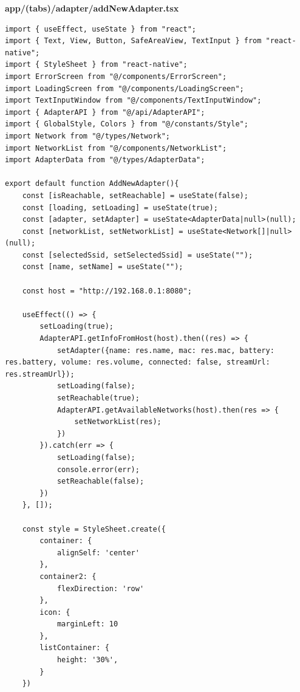 \documentclass[11pt, twoside]{article}
\begin{document}
\textbf{app/(tabs)/adapter/addNewAdapter.tsx}
\begin{lstlisting}
import { useEffect, useState } from "react";
import { Text, View, Button, SafeAreaView, TextInput } from "react-native";
import { StyleSheet } from "react-native";
import ErrorScreen from "@/components/ErrorScreen";
import LoadingScreen from "@/components/LoadingScreen";
import TextInputWindow from "@/components/TextInputWindow";
import { AdapterAPI } from "@/api/AdapterAPI";
import { GlobalStyle, Colors } from "@/constants/Style";
import Network from "@/types/Network";
import NetworkList from "@/components/NetworkList";
import AdapterData from "@/types/AdapterData";

export default function AddNewAdapter(){
    const [isReachable, setReachable] = useState(false);
    const [loading, setLoading] = useState(true);
    const [adapter, setAdapter] = useState<AdapterData|null>(null);
    const [networkList, setNetworkList] = useState<Network[]|null>(null);
    const [selectedSsid, setSelectedSsid] = useState("");
    const [name, setName] = useState("");

    const host = "http://192.168.0.1:8080";

    useEffect(() => {
        setLoading(true);
        AdapterAPI.getInfoFromHost(host).then((res) => {
            setAdapter({name: res.name, mac: res.mac, battery: res.battery, volume: res.volume, connected: false, streamUrl: res.streamUrl});
            setLoading(false);
            setReachable(true);
            AdapterAPI.getAvailableNetworks(host).then(res => {
                setNetworkList(res);
            })
        }).catch(err => {
            setLoading(false);
            console.error(err);
            setReachable(false);
        })
    }, []);

    const style = StyleSheet.create({
        container: {
            alignSelf: 'center'
        },
        container2: {
            flexDirection: 'row'
        },
        icon: {
            marginLeft: 10
        },
        listContainer: {
            height: '30%',
        }
    })


\end{lstlisting}
\end{document}
